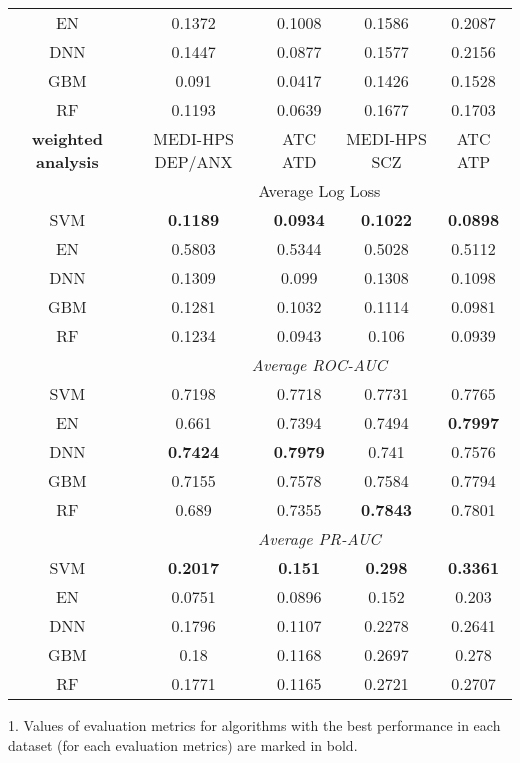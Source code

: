 \begin{table}[htbp]
\begin{threeparttable}
\begin{tabular}{c|cccc}
          EN    & 0.1372 & 0.1008 & 0.1586 & 0.2087 \\
          DNN   & 0.1447 & 0.0877 & 0.1577 & 0.2156 \\
          GBM   & 0.091 & 0.0417 & 0.1426 & 0.1528 \\
          RF    & 0.1193 & 0.0639 & 0.1677 & 0.1703 \\
          \midrule
          \textbf{weighted analysis} & MEDI-HPS DEP/ANX & ATC ATD  & MEDI-HPS SCZ  & ATC ATP \\
          \midrule
                & \multicolumn{4}{c}{Average Log Loss}  \\
          SVM   & \textbf{0.1189} & \textbf{0.0934} & \textbf{0.1022} & \textbf{0.0898} \\
          EN    & 0.5803 & 0.5344 & 0.5028 & 0.5112 \\
          DNN   & 0.1309 & 0.099 & 0.1308 & 0.1098 \\
          GBM   & 0.1281 & 0.1032 & 0.1114 & 0.0981 \\
          RF    & 0.1234 & 0.0943 & 0.106 & 0.0939 \\
                & \multicolumn{4}{c}{\textit{Average ROC-AUC}} \\
          SVM   & 0.7198 & 0.7718 & 0.7731 & 0.7765 \\
          EN    & 0.661 & 0.7394 & 0.7494 & \textbf{0.7997} \\
          DNN   & \textbf{0.7424} & \textbf{0.7979} & 0.741 & 0.7576 \\
          GBM   & 0.7155 & 0.7578 & 0.7584 & 0.7794 \\
          RF    & 0.689 & 0.7355 & \textbf{0.7843} & 0.7801 \\
                & \multicolumn{4}{c}{\textit{Average PR-AUC}} \\
          SVM   & \textbf{0.2017} & \textbf{0.151} & \textbf{0.298} & \textbf{0.3361} \\
          EN    & 0.0751 & 0.0896 & 0.152 & 0.203 \\
          DNN   & 0.1796 & 0.1107 & 0.2278 & 0.2641 \\
          GBM   & 0.18  & 0.1168 & 0.2697 & 0.278 \\
          RF    & 0.1771 & 0.1165 & 0.2721 & 0.2707 \\
          \bottomrule
          \end{tabular}%
          \begin{tablenotes}
            \small
            \item 1. Values of evaluation metrics for algorithms with the best performance in each dataset (for each evaluation metrics) are marked in bold. 

\end{tablenotes}
\end{threeparttable}
\end{table}
